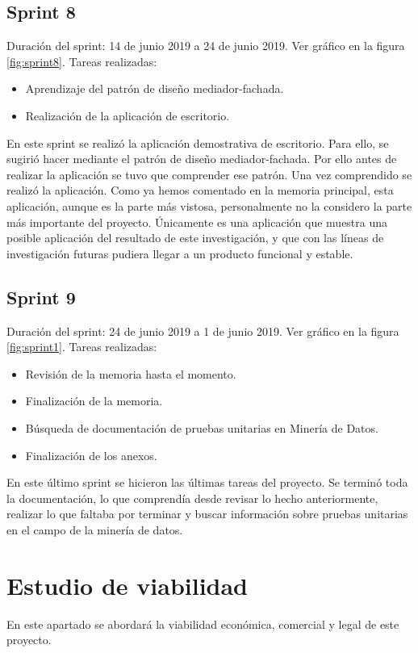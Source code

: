 \subsection{Sprint 8}
Duración del sprint: 14 de junio 2019 a 24 de junio 2019. Ver gráfico  en la figura \ref{fig:sprint8}.
Tareas realizadas:
\begin{itemize}
\item Aprendizaje del patrón de diseño mediador-fachada.
\item Realización de la aplicación de escritorio.
\end{itemize}
En este sprint se realizó la aplicación demostrativa de escritorio. Para ello, se sugirió hacer mediante el patrón de diseño mediador-fachada. Por ello antes de realizar la aplicación se tuvo que comprender ese patrón. Una vez comprendido se realizó la aplicación. Como ya hemos comentado en la memoria principal, esta aplicación, aunque es la parte más vistosa, personalmente no la considero la parte más importante del proyecto. Únicamente es una aplicación que muestra una posible aplicación del resultado de este investigación, y que con las líneas de investigación futuras pudiera llegar a un producto funcional y estable.

\subsection{Sprint 9}
Duración del sprint: 24 de junio 2019 a 1 de junio 2019. Ver gráfico  en la figura \ref{fig:sprint1}.
Tareas realizadas:
\begin{itemize}
\item Revisión de la memoria hasta el momento.
\item Finalización de la memoria.
\item Búsqueda de documentación de pruebas unitarias en Minería de Datos.
\item Finalización de los anexos.
\end{itemize}
En este último sprint se hicieron las últimas tareas del proyecto. Se terminó toda la documentación, lo que comprendía desde revisar lo hecho anteriormente, realizar lo que faltaba por terminar y buscar información sobre pruebas unitarias en el campo de la minería de datos.


\section{Estudio de viabilidad}
En este apartado se abordará la viabilidad económica, comercial y legal de este proyecto.

